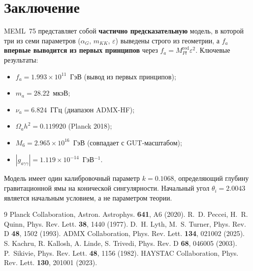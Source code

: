 \documentclass[12pt,a4paper]{article}
\numberwithin{equation}{section}
\begin{document}
\section{Заключение}
MEML~75 представляет собой \textbf{частично предсказательную} модель, 
в которой три из семи параметров ($\alpha_G$, $m_{KK}$, $\varepsilon$) 
выведены строго из геометрии, а $f_a$ \textbf{впервые выводится из 
первых принципов} через $f_a = M_{Pl}^{\text{red}}\varepsilon^2$. 
Ключевые результаты:
\begin{itemize}
\item $f_a = 1.993\times 10^{11}$~ГэВ (вывод из первых принципов);
\item $m_a = 28.22$~мкэВ;
\item $\nu_a = 6.824$~ГГц (диапазон ADMX-HF);
\item $\Omega_a h^2 = 0.119920$ (Planck 2018);
\item $M_6 = 2.965\times 10^{16}$~ГэВ (совпадает с GUT-масштабом);
\item $|g_{a\gamma\gamma}| = 1.119\times 10^{-14}$~ГэВ$^{-1}$.
\end{itemize}
Модель имеет один калибровочный параметр $k = 0.1068$, определяющий 
глубину гравитационной ямы на конической сингулярности. Начальный угол 
$\theta_i = 2.0043$ является начальным условием, а не параметром теории.

\begin{thebibliography}{9}
 Planck Collaboration, Astron. Astrophys. 
\textbf{641}, A6 (2020).
 R.~D. Peccei, H.~R. Quinn, Phys. Rev. Lett. 
\textbf{38}, 1440 (1977).
 D.~H. Lyth, M.~S. Turner, Phys. Rev. D \textbf{48}, 
1502 (1993).
 ADMX Collaboration, Phys. Rev. Lett. \textbf{134}, 
021002 (2025).
 S. Kachru, R. Kallosh, A. Linde, S. Trivedi, 
Phys. Rev. D \textbf{68}, 046005 (2003).
 P.~Sikivie, Phys. Rev. Lett. \textbf{48}, 
1156 (1982).
 HAYSTAC Collaboration, Phys. Rev. Lett. 
\textbf{130}, 201001 (2023).
\end{thebibliography}
\end{document}
